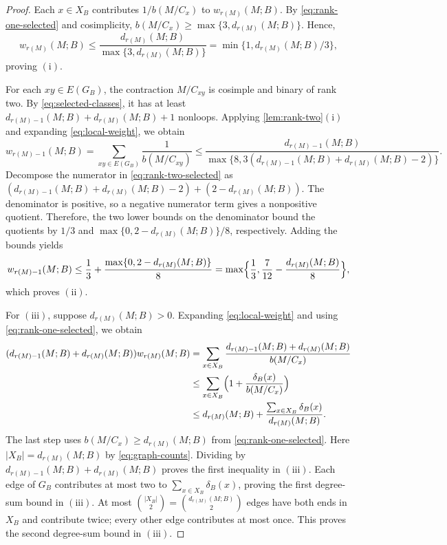 \documentclass[11pt]{article}
\numberwithin{equation}{section}
\newcommand{\wloc}[1]{w_{#1}(M;B)}
\newcommand{\dloc}[1]{d_{#1}(M;B)}
\begin{document}
\begin{proof}
Each \(x\in X_B\) contributes \(1/b(M/C_x)\) to \(\wloc{r(M)}\).
By \eqref{eq:rank-one-selected} and cosimplicity,
\(b(M/C_x)\ge\max\{3,\dloc{r(M)}\}\). Hence,
\[
 \wloc{r(M)}\le
 \frac{\dloc{r(M)}}{\max\{3,\dloc{r(M)}\}}
 =\min\{1,\dloc{r(M)}/3\},
\]
proving \(\mathrm{(i)}\).

For each \(xy\in E(G_B)\), the contraction \(M/C_{xy}\)
is cosimple and binary of rank two. By \eqref{eq:selected-classes},
it has at least \(\dloc{r(M)-1}+\dloc{r(M)}+1\) nonloops.
Applying \autoref{lem:rank-two}\(\mathrm{(i)}\) and
expanding \eqref{eq:local-weight}, we obtain
\begin{equation}\label{eq:rank-two-selected}
 \wloc{r(M)-1}=\sum_{xy\in E(G_B)}\frac1{b(M/C_{xy})}\le\frac{\dloc{r(M)-1}}{\max\{8,3(\dloc{r(M)-1}+\dloc{r(M)}-2)\}}.
\end{equation}
Decompose the numerator in \eqref{eq:rank-two-selected} as
\((\dloc{r(M)-1}+\dloc{r(M)}-2)+(2-\dloc{r(M)})\).
The denominator is positive, so a negative numerator term gives
a nonpositive quotient. Therefore, the two lower bounds on the denominator
bound the quotients by \(1/3\) and
\(\max\{0,2-\dloc{r(M)}\}/8\), respectively. Adding the bounds yields
\[
 \wloc{r(M)-1}\le\frac13+\frac{\max\{0,2-\dloc{r(M)}\}}8
 =\max\Bigl\{\frac13,\frac7{12}-\frac{\dloc{r(M)}}8\Bigr\},
\]
which proves \(\mathrm{(ii)}\).

For \(\mathrm{(iii)}\), suppose \(\dloc{r(M)}>0\).
Expanding \eqref{eq:local-weight} and using \eqref{eq:rank-one-selected}, we obtain
\begin{align*}
 (\dloc{r(M)-1}+\dloc{r(M)})\wloc{r(M)}&=\sum_{x\in X_B}\frac{\dloc{r(M)-1}+\dloc{r(M)}}{b(M/C_x)}\\
 &\le\sum_{x\in X_B}\Bigl(1+\frac{\delta_B(x)}{b(M/C_x)}\Bigr)\\
 &\le\dloc{r(M)}+\frac{\sum_{x\in X_B}\delta_B(x)}{\dloc{r(M)}}.
\end{align*}
The last step uses \(b(M/C_x)\ge\dloc{r(M)}\) from
\eqref{eq:rank-one-selected}.
Here \(|X_B|=\dloc{r(M)}\) by \eqref{eq:graph-counts}.
Dividing by \(\dloc{r(M)-1}+\dloc{r(M)}\) proves the first inequality in
\(\mathrm{(iii)}\).
Each edge of \(G_B\) contributes at most two to
\(\sum_{x\in X_B}\delta_B(x)\), proving the first degree-sum bound in
\(\mathrm{(iii)}\).
At most \(\binom{|X_B|}2=\binom{\dloc{r(M)}}2\) edges have both ends in
\(X_B\) and contribute twice; every other edge contributes at most once.
This proves the second degree-sum bound in \(\mathrm{(iii)}\).


\end{proof}
\end{document}
